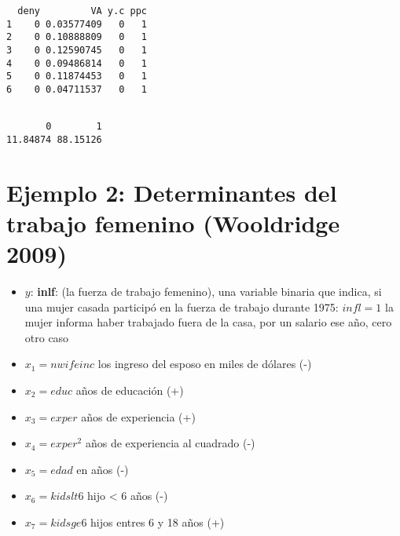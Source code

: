 \documentclass[
  letterpaper,
  DIV=11,
  numbers=noendperiod]{scrreprt}
\newenvironment{Shaded}{\begin{snugshade}}{\end{snugshade}}
\newcommand{\CommentTok}[1]{\textcolor[rgb]{0.37,0.37,0.37}{#1}}
\newcommand{\DecValTok}[1]{\textcolor[rgb]{0.68,0.00,0.00}{#1}}
\newcommand{\FunctionTok}[1]{\textcolor[rgb]{0.28,0.35,0.67}{#1}}
\newcommand{\NormalTok}[1]{\textcolor[rgb]{0.00,0.23,0.31}{#1}}
\newcommand{\OtherTok}[1]{\textcolor[rgb]{0.00,0.23,0.31}{#1}}
\newcommand{\SpecialCharTok}[1]{\textcolor[rgb]{0.37,0.37,0.37}{#1}}
\begin{document}
\begin{Shaded}
\end{Shaded}

\begin{verbatim}
  deny         VA y.c ppc
1    0 0.03577409   0   1
2    0 0.10888809   0   1
3    0 0.12590745   0   1
4    0 0.09486814   0   1
5    0 0.11874453   0   1
6    0 0.04711537   0   1
\end{verbatim}

\begin{Shaded}
\end{Shaded}

\begin{verbatim}

       0        1 
11.84874 88.15126 
\end{verbatim}

\section{Ejemplo 2: Determinantes del trabajo femenino (Wooldridge
2009)}\label{ejemplo-2-determinantes-del-trabajo-femenino-wooldridge2009}

\begin{itemize}
\item
  \(y\): \textbf{inlf}: (la fuerza de trabajo femenino), una variable
  binaria que indica, si una mujer casada participó en la fuerza de
  trabajo durante 1975: \(infl=1\) la mujer informa haber trabajado
  fuera de la casa, por un salario ese año, cero otro caso
\item
  \(x_1=nwifeinc\) los ingreso del esposo en miles de dólares (-)
\item
  \(x_2=educ\) años de educación (+)
\item
  \(x_3=exper\) años de experiencia (+)
\item
  \(x_4=exper^2\) años de experiencia al cuadrado (-)
\item
  \(x_5=edad\) en años (-)
\item
  \(x_6=kidslt6\) hijo \textless{} 6 años (-)
\item
  \(x_7=kidsge6\) hijos entres 6 y 18 años (+)
\end{itemize}
\end{document}
